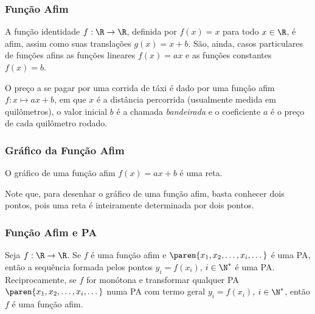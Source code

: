 \documentclass[brazil, notheorems, 10pt]{beamer}
\begin{document}
\begin{frame}
\frametitle{Função Afim} %

\begin{Exem}
A função identidade $f: \R \to \R$, definida por $f(x) = x$ para
todo $x \in \R$, é afim, assim como suas translações $g(x) = x+b$.
São, ainda, casos particulares de funções afins as funções lineares
$f(x) = ax$ e as funções constantes $f(x) = b$.
\end{Exem}\pause

\begin{Exem}
O preço a se pagar por uma corrida de táxi é dado por uma função
afim $f: x \mapsto ax+b$, em que $x$ é a distância percorrida
(usualmente medida em quilômetros), o valor inicial $b$ é a chamada
\emph{bandeirada} e o coeficiente $a$ é o preço de cada quilômetro
rodado.
\end{Exem}

\end{frame}


\begin{frame}
\frametitle{Gráfico da Função Afim} %
\begin{Prop}
O gráfico de uma função afim $f(x) = ax + b$ é uma reta.
\end{Prop}\pause
Note que, para desenhar o gráfico de uma função afim, basta conhecer
dois pontos, pois uma reta é inteiramente determinada por dois
pontos.

\end{frame}


\begin{frame}
\frametitle{Função Afim e PA} %

\begin{Prop}
Seja  $f: \R \to \R$. Se $f$ é uma função afim e $\paren{x_1, x_2,
\dots , x_i, \dots}$ é uma PA, então a sequência formada pelos
pontos $y_i = f(x_i)$, $i \in \N^{\ast}$ é uma PA. Reciprocamente,
se $f$ for monótona e transformar qualquer PA $\paren{x_1, x_2,
\dots , x_i, \dots}$ numa PA com termo geral $y_i = f(x_i)$, $i \in
\N^{\ast}$, então $f$ é uma função afim.
\end{Prop}


\end{frame}
\end{document}

